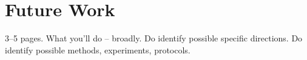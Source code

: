 \section{Future Work}
3--5 pages.
What you'll do -- broadly.
Do identify possible specific directions.
Do identify possible methods, experiments, protocols.
